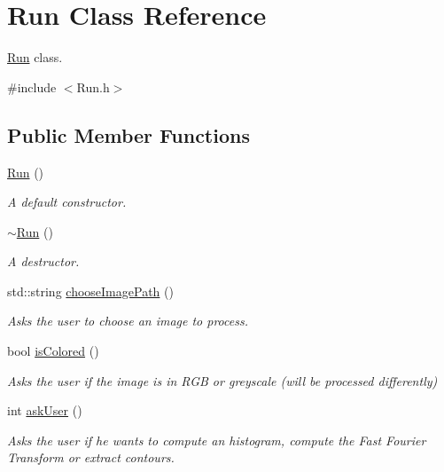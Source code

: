 \hypertarget{class_run}{}\section{Run Class Reference}
\label{class_run}


\hyperlink{class_run}{Run} class.  




{\ttfamily \#include $<$Run.\+h$>$}

\subsection*{Public Member Functions}
\begin{DoxyCompactItemize}
\item 
\mbox{\label{class_run_ad9511732117430d7fcdc0c11796f0ef6}} 
\hyperlink{class_run_ad9511732117430d7fcdc0c11796f0ef6}{Run} ()
\begin{DoxyCompactList}\small\item\em A default constructor. \end{DoxyCompactList}\item 
\mbox{\label{class_run_a7fa0ac1770a5067113aaa1928be3d742}} 
\hyperlink{class_run_a7fa0ac1770a5067113aaa1928be3d742}{$\sim$\+Run} ()
\begin{DoxyCompactList}\small\item\em A destructor. \end{DoxyCompactList}\item 
std\+::string \hyperlink{class_run_aa5f70a3b468b1fc5eeb06e5300d6fdb2}{choose\+Image\+Path} ()
\begin{DoxyCompactList}\small\item\em Asks the user to choose an image to process. \end{DoxyCompactList}\item 
bool \hyperlink{class_run_acb7e1319ac1b8d82f932de967d31689d}{is\+Colored} ()
\begin{DoxyCompactList}\small\item\em Asks the user if the image is in R\+GB or greyscale (will be processed differently) \end{DoxyCompactList}\item 
int \hyperlink{class_run_a5493b768fdf04b773ab5a2ddcec8d805}{ask\+User} ()
\begin{DoxyCompactList}\small\item\em Asks the user if he wants to compute an histogram, compute the Fast Fourier Transform or extract contours. \end{DoxyCompactList}\item 

\end{DoxyCompactItemize}
